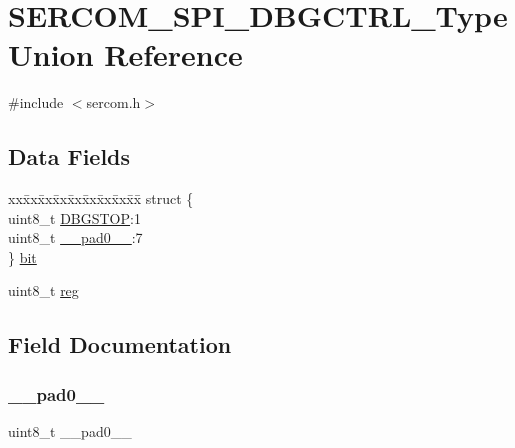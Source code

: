 \hypertarget{union_s_e_r_c_o_m___s_p_i___d_b_g_c_t_r_l___type}{}\section{S\+E\+R\+C\+O\+M\+\_\+\+S\+P\+I\+\_\+\+D\+B\+G\+C\+T\+R\+L\+\_\+\+Type Union Reference}
\label{union_s_e_r_c_o_m___s_p_i___d_b_g_c_t_r_l___type}


{\ttfamily \#include $<$sercom.\+h$>$}

\subsection*{Data Fields}
\begin{DoxyCompactItemize}
\item 
\begin{tabbing}
xx\=xx\=xx\=xx\=xx\=xx\=xx\=xx\=xx\=\kill
struct \{\\
\>uint8\_t \mbox{\hyperlink{union_s_e_r_c_o_m___s_p_i___d_b_g_c_t_r_l___type_ace8eb5df93c3176eb9283ab7f4b25bfb}{DBGSTOP}}:1\\
\>uint8\_t \mbox{\hyperlink{union_s_e_r_c_o_m___s_p_i___d_b_g_c_t_r_l___type_a8b4eebe79ded0459acec2f4950102ba3}{\_\_pad0\_\_}}:7\\
\} \mbox{\hyperlink{union_s_e_r_c_o_m___s_p_i___d_b_g_c_t_r_l___type_a40b31095f26e9f3a79cada2ed1b63917}{bit}}\\

\end{tabbing}\item 
uint8\+\_\+t \mbox{\hyperlink{union_s_e_r_c_o_m___s_p_i___d_b_g_c_t_r_l___type_a9428adc9af4653a2050e2536b55dec8d}{reg}}
\end{DoxyCompactItemize}


\subsection{Field Documentation}
\mbox{\label{union_s_e_r_c_o_m___s_p_i___d_b_g_c_t_r_l___type_a8b4eebe79ded0459acec2f4950102ba3}} 
\subsubsection{\texorpdfstring{\_\_pad0\_\_}{\_\_pad0\_\_}}
{\footnotesize\ttfamily uint8\+\_\+t \+\_\+\+\_\+pad0\+\_\+\+\_\+}

